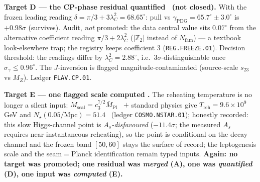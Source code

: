 \documentclass[11pt,a4paper]{article}
\newcommand{\cthree}{c_3}
\newcommand{\Nfam}{N_{\mathrm{fam}}}
\begin{document}
\begin{winbox}
\smallskip\noindent\textbf{Target D --- the CP-phase residual quantified \mE\ (not closed).} With the frozen leading
reading $\delta=\pi/3+3\lambda_C^2=68.65^\circ$: pull vs $\gamma_{\mathrm{PDG}}=65.7^\circ\pm3.0^\circ$ is $+0.98\sigma$
(survives). Audit, \emph{not} promoted: the data central value sits $0.07^\circ$ from the alternative coefficient
reading $\pi/3+2\lambda_C^2$ ($|\mathbb Z_2|$ instead of $\Nfam$) --- a textbook look-elsewhere trap; the registry keeps
coefficient $3$ (\texttt{REG.FREEZE.01}). Decision threshold: the readings differ by $\lambda_C^2=2.88^\circ$, i.e.\
$3\sigma$-distinguishable once $\sigma_\gamma\le0.96^\circ$. The $J$-inversion is flagged magnitude-contaminated
(source-scale $s_{23}$ vs $M_Z$). Ledger \texttt{FLAV.CP.01}.

\smallskip\noindent\textbf{Target E --- one flagged scale computed \mC.} The reheating temperature is no longer a
silent input: $M_{\mathrm{scal}}=\cthree^{7/2}\bar M_{\mathrm{Pl}}$ \mE\ $+$ standard physics give
$T_{\mathrm{reh}}=9.6\times10^9$ GeV and $N_\star(0.05/\mathrm{Mpc})=51.4$ \mC\ (ledger \texttt{COSMO.NSTAR.01});
honestly recorded: this slow Higgs-channel point is \emph{$A_s$-disfavoured} ($-11.4\sigma$; the measured $A_s$
requires near-instantaneous reheating), so the point is conditional on the decay channel and the frozen band
$[50,60]$ stays the surface of record; the leptogenesis scale and the seam$=$Planck identification remain typed
inputs. \textbf{Again: no target was
promoted; one residual was \emph{merged} (A), one was \emph{quantified} (D), one input was \emph{computed} (E).}
\end{winbox}
\end{document}
